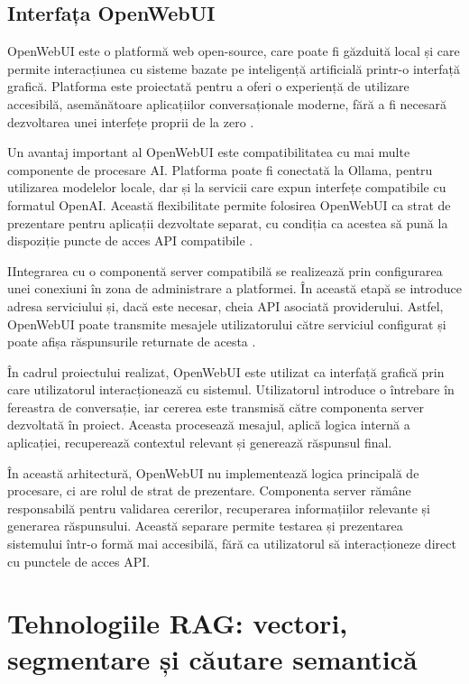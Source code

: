 \documentclass[12pt, a4paper, oneside, romanian]{teza-upb}
\begin{document}
\subsection{Interfața OpenWebUI}

OpenWebUI este o platformă web open-source, care poate fi găzduită local și care permite interacțiunea cu sisteme bazate pe inteligență artificială printr-o interfață grafică. Platforma este proiectată pentru a oferi o experiență de utilizare accesibilă, asemănătoare aplicațiilor conversaționale moderne, fără a fi necesară dezvoltarea unei interfețe proprii de la zero \cite{openwebui_doc}.

Un avantaj important al OpenWebUI este compatibilitatea cu mai multe componente de procesare AI. Platforma poate fi conectată la Ollama, pentru utilizarea modelelor locale, dar și la servicii care expun interfețe compatibile cu formatul OpenAI. Această flexibilitate permite folosirea OpenWebUI ca strat de prezentare pentru aplicații dezvoltate separat, cu condiția ca acestea să pună la dispoziție puncte de acces API compatibile \cite{openwebui_doc}.

IIntegrarea cu o componentă server compatibilă se realizează prin configurarea unei conexiuni în zona de administrare a platformei. În această etapă se introduce adresa serviciului și, dacă este necesar, cheia API asociată providerului. Astfel, OpenWebUI poate transmite mesajele utilizatorului către serviciul configurat și poate afișa răspunsurile returnate de acesta \cite{openwebui_openai_compatible}.

În cadrul proiectului realizat, OpenWebUI este utilizat ca interfață grafică prin care utilizatorul interacționează cu sistemul. Utilizatorul introduce o întrebare în fereastra de conversație, iar cererea este transmisă către componenta server dezvoltată în proiect. Aceasta procesează mesajul, aplică logica internă a aplicației, recuperează contextul relevant și generează răspunsul final.

În această arhitectură, OpenWebUI nu implementează logica principală de procesare, ci are rolul de strat de prezentare. Componenta server rămâne responsabilă pentru validarea cererilor, recuperarea informațiilor relevante și generarea răspunsului. Această separare permite testarea și prezentarea sistemului într-o formă mai accesibilă, fără ca utilizatorul să interacționeze direct cu punctele de acces API.




\section{Tehnologiile RAG: vectori, segmentare și căutare semantică}
\end{document}
